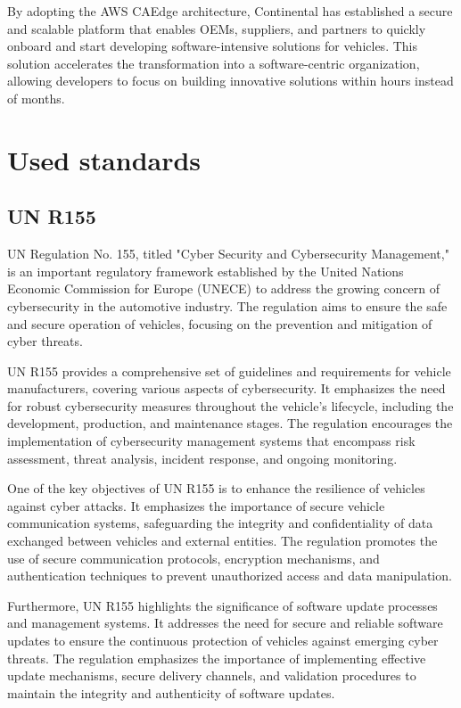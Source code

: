 \documentclass[
12pt,
oneside, 
onehalfspacing, 
nolistspacing, 
parskip, 
chapterinoneline, 
]{AASTCOMPUTER}
\begin{document}
By adopting the AWS CAEdge architecture, Continental has established a secure and scalable platform that enables OEMs, suppliers, and partners to quickly onboard and start developing software-intensive solutions for vehicles. This solution accelerates the transformation into a software-centric organization, allowing developers to focus on building innovative solutions within hours instead of months.

\section{Used standards}

\subsection{UN R155}
UN Regulation No. 155, titled "Cyber Security and Cybersecurity Management," \cite{UNR155} is an important regulatory framework established by the United Nations Economic Commission for Europe (UNECE) to address the growing concern of cybersecurity in the automotive industry. The regulation aims to ensure the safe and secure operation of vehicles, focusing on the prevention and mitigation of cyber threats.

UN R155 provides a comprehensive set of guidelines and requirements for vehicle manufacturers, covering various aspects of cybersecurity. It emphasizes the need for robust cybersecurity measures throughout the vehicle's lifecycle, including the development, production, and maintenance stages. The regulation encourages the implementation of cybersecurity management systems that encompass risk assessment, threat analysis, incident response, and ongoing monitoring.

One of the key objectives of UN R155 is to enhance the resilience of vehicles against cyber attacks. It emphasizes the importance of secure vehicle communication systems, safeguarding the integrity and confidentiality of data exchanged between vehicles and external entities. The regulation promotes the use of secure communication protocols, encryption mechanisms, and authentication techniques to prevent unauthorized access and data manipulation.

Furthermore, UN R155 highlights the significance of software update processes and management systems. It addresses the need for secure and reliable software updates to ensure the continuous protection of vehicles against emerging cyber threats. The regulation emphasizes the importance of implementing effective update mechanisms, secure delivery channels, and validation procedures to maintain the integrity and authenticity of software updates.
\end{document}
